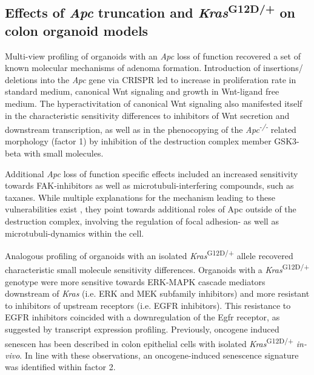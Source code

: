\begin{flushleft}
\clearpage
\subsection{Effects of \textit{Apc} truncation and \textit{Kras}\textsuperscript{G12D/+} on colon organoid models}

Multi-view profiling of organoids with an \textit{Apc} loss of function recovered a set of known molecular mechanisms of adenoma formation. Introduction of insertions/ deletions into the \textit{Apc} gene via CRISPR led to increase in proliferation rate in standard medium, canonical Wnt signaling and growth in Wnt-ligand free medium. The hyperactivitation of canonical Wnt signaling also manifested itself in the characteristic sensitivity differences to inhibitors of Wnt secretion and downstream transcription, as well as in the phenocopying of the \textit{Apc\textsuperscript{-/-}} related morphology (factor 1) by inhibition of the destruction complex member GSK3-beta with small molecules.
\smallbreak

Additional \textit{Apc} loss of function specific effects included an increased sensitivity towards FAK-inhibitors as well as microtubuli-interfering compounds, such as taxanes. While multiple explanations for the mechanism leading to these vulnerabilities exist \parencite{ashtonFocalAdhesionKinase2010}, they point towards additional roles of Apc outside of the destruction complex, involving the regulation of focal adhesion- \parencite{ashtonFocalAdhesionKinase2010, matsumotoBindingAPCDishevelled2010} as well as microtubuli-dynamics \parencite{stolzWntMediatedProtein2015} within the cell.
\smallbreak

Analogous profiling of organoids with an isolated \textit{Kras}\textsuperscript{G12D/+} allele recovered characteristic small molecule sensitivity differences. Organoids with a \textit{Kras}\textsuperscript{G12D/+} genotype were more sensitive towards ERK-MAPK cascade mediators downstream of \textit{Kras} (i.e. ERK and MEK subfamily inhibitors) and more resistant to inhibitors of upstream receptors (i.e. EGFR inhibitors). This resistance to EGFR inhibitors coincided with a downregulation of the Egfr receptor, as suggested by transcript expression profiling. Previously, oncogene induced senescen has been described in colon epithelial cells with isolated \textit{Kras}\textsuperscript{G12D/+} \parencite{benneckeInk4aArfOncogeneinduced2010} \textit{in-vivo}. In line with these observations, an oncogene-induced senescence signature was identified within factor 2.
\smallbreak


\end{flushleft}
